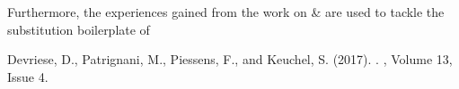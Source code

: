 {Furthermore, the experiences gained from the work on \Needle \& \Knot are used
to tackle the substitution boilerplate of

\begin{center}
  \begin{minipage}{0.85\columnwidth}
    Devriese, D., Patrignani, M., Piessens, F., and Keuchel, S. (2017).
    .
    , {Volume 13, Issue 4}.
  \end{minipage}
\end{center}


} %









